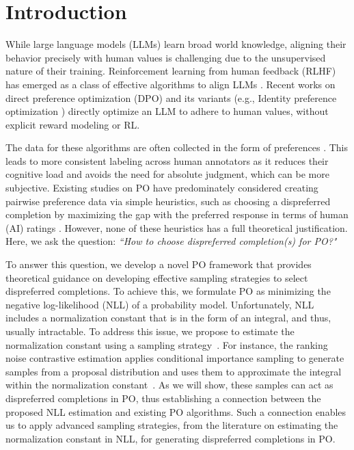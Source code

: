 

\section{Introduction}
\label{sec: introduction}
While large language models (LLMs) learn broad world knowledge, aligning their behavior precisely with human values is challenging due to the unsupervised nature of their training.
Reinforcement learning from human feedback (RLHF) \citep{ouyang2022training} has emerged as a class of effective algorithms to align LLMs \citep{schulman2017proximal}.
Recent works on direct preference optimization (DPO) \citep{rafailov2024direct} and its variants (e.g., Identity preference optimization \citep{azar2024general}) directly optimize an LLM to adhere to human values, without explicit reward modeling or RL.

The data for these algorithms are often collected in the form of preferences \citep{ziegler2019fine}.
This leads to more consistent labeling across human annotators as it reduces their cognitive load and avoids the need for absolute judgment, which can be more subjective. 
Existing studies on PO have predominately considered creating pairwise preference data via simple heuristics,
such as choosing a dispreferred completion by maximizing the gap with the preferred response in terms of human (AI) ratings \citep{tunstall2023zephyr,lambert2024t}.
However,
none of these heuristics has a full theoretical justification.
Here, we ask the question:
{\em ``How to choose dispreferred completion(s) for PO?"}


To answer this question,
we develop a novel PO framework that provides theoretical guidance on developing effective sampling strategies to select dispreferred completions.
To achieve this, we formulate PO as minimizing the negative log-likelihood (NLL) of a probability model. 
Unfortunately, NLL includes a normalization constant that is in the form of an integral, and thus, usually intractable. 
To address this issue, we propose to estimate the normalization constant using a sampling strategy~\citep{naesseth2024elementssequentialmontecarlo}. 
For instance, the ranking noise contrastive estimation applies conditional importance sampling to generate samples from a proposal distribution and uses them to approximate the integral within the normalization constant~\citep{olmin2024connection}. As we will show, these samples can act as dispreferred completions in PO, thus establishing a connection between the proposed NLL estimation and existing PO algorithms. 
Such a connection enables us to apply advanced sampling strategies, from the literature on estimating the normalization constant in NLL, for generating dispreferred completions in PO.

